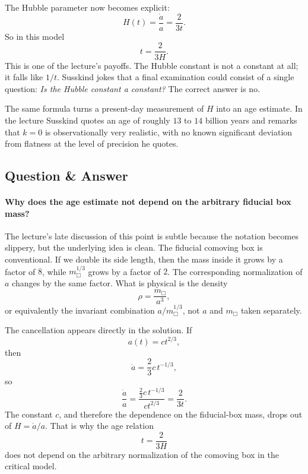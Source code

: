 The Hubble parameter now becomes explicit:
\begin{equation}
H(t)=\frac{\dot a}{a}=\frac{2}{3t}.
\end{equation}
So in this model
\begin{equation}
t=\frac{2}{3H}.
\end{equation}
This is one of the lecture's payoffs. The Hubble constant is not a constant at all; it falls like \(1/t\). Susskind jokes that a final examination could consist of a single question: \emph{Is the Hubble constant a constant?} The correct answer is no.

The same formula turns a present-day measurement of \(H\) into an age estimate. In the lecture Susskind quotes an age of roughly \(13\) to \(14\) billion years and remarks that \(k=0\) is observationally very realistic, with no known significant deviation from flatness at the level of precision he quotes.

\subsection{Question \& Answer}

\paragraph{Why does the age estimate not depend on the arbitrary fiducial box mass?}
The lecture's late discussion of this point is subtle because the notation becomes slippery, but the underlying idea is clean. The fiducial comoving box is conventional. If we double its side length, then the mass inside it grows by a factor of \(8\), while \(m_{\Box}^{1/3}\) grows by a factor of \(2\). The corresponding normalization of \(a\) changes by the same factor. What is physical is the density
\begin{equation}
\rho=\frac{m_{\Box}}{a^3},
\end{equation}
or equivalently the invariant combination \(a/m_{\Box}^{1/3}\), not \(a\) and \(m_{\Box}\) taken separately.

The cancellation appears directly in the solution. If
\begin{equation}
a(t)=ct^{2/3},
\end{equation}
then
\begin{equation}
\dot a=\frac{2}{3}c\,t^{-1/3},
\end{equation}
so
\begin{equation}
\frac{\dot a}{a}=\frac{\frac{2}{3}c\,t^{-1/3}}{ct^{2/3}}=\frac{2}{3t}.
\end{equation}
The constant \(c\), and therefore the dependence on the fiducial-box mass, drops out of \(H=\dot a/a\). That is why the age relation
\begin{equation}
t=\frac{2}{3H}
\end{equation}
does not depend on the arbitrary normalization of the comoving box in the critical model.


